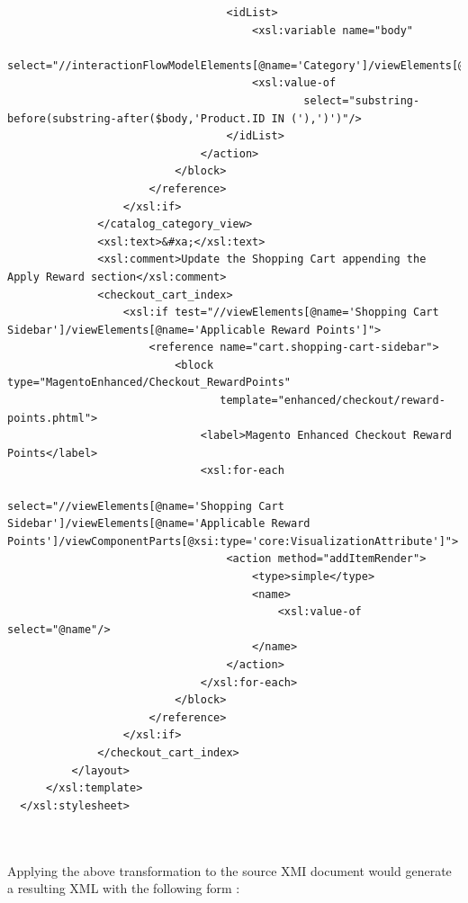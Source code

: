 \begin{lstlisting}
                                  <idList>
                                      <xsl:variable name="body"
                                                    select="//interactionFlowModelElements[@name='Category']/viewElements[@name='RecentlyViewedProducts']/viewComponentParts/subViewComponentParts/@body"/>
                                      <xsl:value-of
                                              select="substring-before(substring-after($body,'Product.ID IN ('),')')"/>
                                  </idList>
                              </action>
                          </block>
                      </reference>
                  </xsl:if>
              </catalog_category_view>
              <xsl:text>&#xa;</xsl:text>
              <xsl:comment>Update the Shopping Cart appending the Apply Reward section</xsl:comment>
              <checkout_cart_index>
                  <xsl:if test="//viewElements[@name='Shopping Cart Sidebar']/viewElements[@name='Applicable Reward Points']">
                      <reference name="cart.shopping-cart-sidebar">
                          <block type="MagentoEnhanced/Checkout_RewardPoints"
                                 template="enhanced/checkout/reward-points.phtml">
                              <label>Magento Enhanced Checkout Reward Points</label>
                              <xsl:for-each
                                      select="//viewElements[@name='Shopping Cart Sidebar']/viewElements[@name='Applicable Reward Points']/viewComponentParts[@xsi:type='core:VisualizationAttribute']">
                                  <action method="addItemRender">
                                      <type>simple</type>
                                      <name>
                                          <xsl:value-of select="@name"/>
                                      </name>
                                  </action>
                              </xsl:for-each>
                          </block>
                      </reference>
                  </xsl:if>
              </checkout_cart_index>
          </layout>
      </xsl:template>
  </xsl:stylesheet>
  
  
\end{lstlisting}
\vspace{0.5cm}

\newpage

Applying the above transformation to the source XMI document would generate a resulting XML with the following form :

